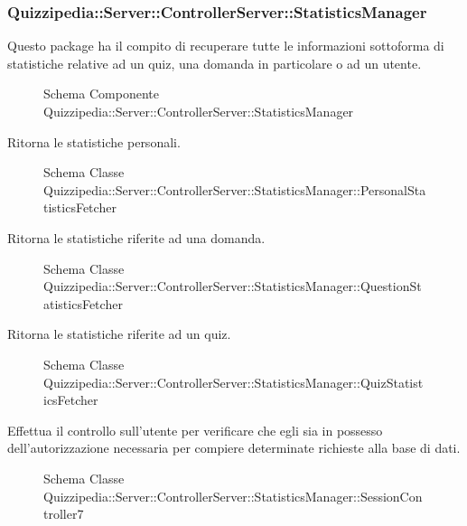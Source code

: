 \subsubsection{Quizzipedia::Server::ControllerServer::StatisticsManager}
Questo package ha il compito di recuperare tutte le informazioni sottoforma di statistiche relative ad un quiz, una domanda in particolare o ad un utente.
\begin{figure}[H]
\centering
\noindent{}
\caption{Schema Componente Quizzipedia::Server::ControllerServer::StatisticsManager}
\end{figure}
Ritorna le statistiche personali.
\begin{figure}[H]
\centering
\noindent{}
\caption{Schema Classe Quizzipedia::Server::ControllerServer::StatisticsManager::PersonalStatisticsFetcher}
\end{figure}
Ritorna le statistiche riferite ad una domanda.
\begin{figure}[H]
\centering
\noindent{}
\caption{Schema Classe Quizzipedia::Server::ControllerServer::StatisticsManager::QuestionStatisticsFetcher}
\end{figure}
Ritorna le statistiche riferite ad un quiz.
\begin{figure}[H]
\centering
\noindent{}
\caption{Schema Classe Quizzipedia::Server::ControllerServer::StatisticsManager::QuizStatisticsFetcher}
\end{figure}
Effettua il controllo sull'utente per verificare che egli sia in possesso dell'autorizzazione necessaria per compiere determinate richieste alla base di dati.
\begin{figure}[H]
\centering
\noindent{}
\caption{Schema Classe Quizzipedia::Server::ControllerServer::StatisticsManager::SessionController7}
\end{figure}
